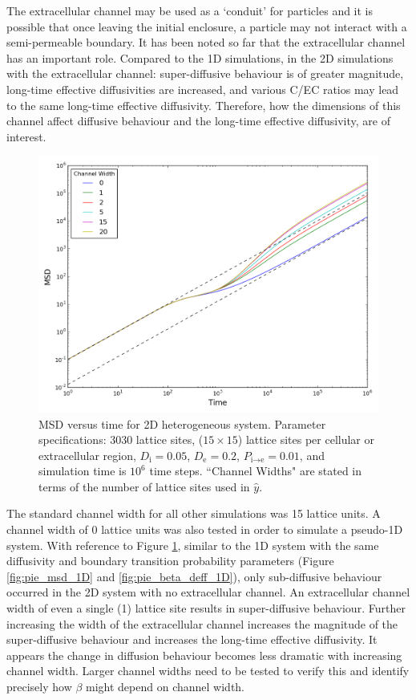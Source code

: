 	The extracellular channel may be used as a `conduit' for particles and it is possible that once leaving the initial enclosure, a particle may not interact with a semi-permeable boundary. It has been noted so far that the extracellular channel has an important role. Compared to the 1D simulations, in the 2D simulations with the extracellular channel: super-diffusive behaviour is of greater magnitude, long-time effective diffusivities are increased, and various C/EC ratios may lead to the same long-time effective diffusivity. Therefore, how the dimensions of this channel affect diffusive behaviour and the long-time effective diffusivity, are of interest.
	
	\begin{figure}[h]
		\centering
		\includegraphics[width=1.0\linewidth]{../images/2D/ye_msd_2D}
		\caption[2D: MSD for varying extracellular channel widths]{MSD versus time for 2D heterogeneous system. Parameter specifications: 3030 lattice sites, ($ 15 \times 15 $) lattice sites per cellular or extracellular region, $ D_\textrm{i} = 0.05 $, $ D_\textrm{e} = 0.2 $, $ P_{\textrm{i} \rightarrow \textrm{e}} = 0.01 $, and simulation time is $ 10^6 $ time steps. ``Channel Widths" are stated in terms of the number of lattice sites used in $ \hat{y} $.}
		\label{fig:ye_msd_2D}
	\end{figure}
	
	\newpage
 	The standard channel width for all other simulations was 15 lattice units. A channel width of 0 lattice units was also tested in order to simulate a pseudo-1D system. With reference to Figure \ref{fig:ye_msd_2D}, similar to the 1D system with the same diffusivity and boundary transition probability parameters (Figure \ref{fig:pie_msd_1D} and \ref{fig:pie_beta_deff_1D}), only sub-diffusive behaviour occurred in the 2D system with no extracellular channel. An extracellular channel width of even a single (1) lattice site results in super-diffusive behaviour. Further increasing the width of the extracellular channel increases the magnitude of the super-diffusive behaviour and increases the long-time effective diffusivity. It appears the change in diffusion behaviour becomes less dramatic with increasing channel width. Larger channel widths need to be tested to verify this and identify precisely how $ \beta $ might depend on channel width.
	
